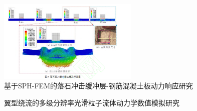 \begin{frame}
    \begin{figure}[H]
        \centering
        \includegraphics[width=0.6\textwidth]{images//ouhedabianxing.png}
        \caption{基于SPH-FEM的落石冲击缓冲层-钢筋混凝土板动力响应研究\cite{_sph-fem-_nodate}}
    \end{figure}
\end{frame}

\begin{frame}
    \begin{figure}[H]
        \centering
        \quad
        \quad
        \caption{翼型绕流的多级分辨率光滑粒子流体动力学数值模拟研究\cite{__2022-3}}
    \end{figure}
\end{frame}

